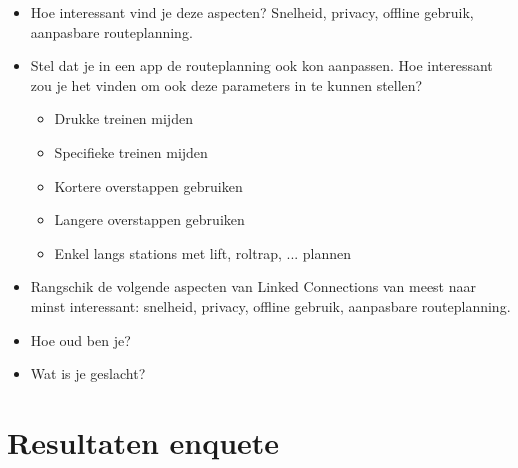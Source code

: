 \begin{appendices}
\begin{itemize}
	\item Hoe interessant vind je deze aspecten? Snelheid, privacy, offline gebruik, aanpasbare routeplanning.
	\item Stel dat je in een app de routeplanning ook kon aanpassen. Hoe interessant zou je het vinden om ook deze parameters in te kunnen stellen?
	\begin{itemize}
		\item Drukke treinen mijden
		\item Specifieke treinen mijden
		\item Kortere overstappen gebruiken	
		\item Langere overstappen gebruiken
		\item Enkel langs stations met lift, roltrap, ... plannen
	\end{itemize}
	\item Rangschik de volgende aspecten van Linked Connections van meest naar minst interessant: snelheid, privacy, offline gebruik, aanpasbare routeplanning.
	\item Hoe oud ben je?
	\item Wat is je geslacht?
\end{itemize}

\chapter{Resultaten enquete}
\label{appendix:report}


\end{appendices}